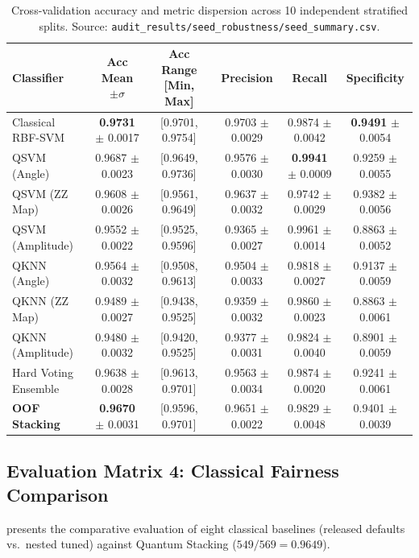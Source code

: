 \begin{table}[H]
\centering
\small
\caption{Cross-validation accuracy and metric dispersion across 10 independent stratified splits. Source: \texttt{audit\_results/seed\_robustness/seed\_summary.csv}.}
\label{tab:multi-seed-summary}
\begin{tabularx}{\textwidth}{lccccc}
\toprule
\textbf{Classifier} & \textbf{Acc Mean $\pm \sigma$} & \textbf{Acc Range [Min, Max]} & \textbf{Precision} & \textbf{Recall} & \textbf{Specificity} \\
\midrule
Classical RBF-SVM     & \textbf{0.9731} $\pm$ 0.0017 & [0.9701, 0.9754] & 0.9703 $\pm$ 0.0029 & 0.9874 $\pm$ 0.0042 & \textbf{0.9491} $\pm$ 0.0054 \\
QSVM (Angle)          & 0.9687 $\pm$ 0.0023 & [0.9649, 0.9736] & 0.9576 $\pm$ 0.0030 & \textbf{0.9941} $\pm$ 0.0009 & 0.9259 $\pm$ 0.0055 \\
QSVM (ZZ Map)         & 0.9608 $\pm$ 0.0026 & [0.9561, 0.9649] & 0.9637 $\pm$ 0.0032 & 0.9742 $\pm$ 0.0029 & 0.9382 $\pm$ 0.0056 \\
QSVM (Amplitude)      & 0.9552 $\pm$ 0.0022 & [0.9525, 0.9596] & 0.9365 $\pm$ 0.0027 & 0.9961 $\pm$ 0.0014 & 0.8863 $\pm$ 0.0052 \\
QKNN (Angle)          & 0.9564 $\pm$ 0.0032 & [0.9508, 0.9613] & 0.9504 $\pm$ 0.0033 & 0.9818 $\pm$ 0.0027 & 0.9137 $\pm$ 0.0059 \\
QKNN (ZZ Map)         & 0.9489 $\pm$ 0.0027 & [0.9438, 0.9525] & 0.9359 $\pm$ 0.0032 & 0.9860 $\pm$ 0.0023 & 0.8863 $\pm$ 0.0061 \\
QKNN (Amplitude)      & 0.9480 $\pm$ 0.0032 & [0.9420, 0.9525] & 0.9377 $\pm$ 0.0031 & 0.9824 $\pm$ 0.0040 & 0.8901 $\pm$ 0.0059 \\
Hard Voting Ensemble  & 0.9638 $\pm$ 0.0028 & [0.9613, 0.9701] & 0.9563 $\pm$ 0.0034 & 0.9874 $\pm$ 0.0020 & 0.9241 $\pm$ 0.0061 \\
\textbf{OOF Stacking} & \textbf{0.9670} $\pm$ 0.0031 & [0.9596, 0.9701] & 0.9651 $\pm$ 0.0022 & 0.9829 $\pm$ 0.0048 & 0.9401 $\pm$ 0.0039 \\
\bottomrule
\end{tabularx}
\end{table}

\subsection{Evaluation Matrix 4: Classical Fairness Comparison}
 presents the comparative evaluation of eight classical baselines (released defaults vs.\ nested tuned) against Quantum Stacking ($549/569 = 0.9649$).

